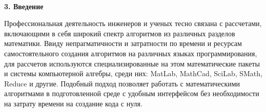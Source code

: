 \documentclass[russian,utf8,nocolumnxxxi,nocolumnxxxii]{eskdtext}
\begin{document}
\begin{figure}[H]
\begin{center}
\begin{minipage}[h]{0.75\linewidth}
  \\
\end{minipage}
\end{center}
\end{figure}
\newpage

{\bf3. Введение}

Профессиональная деятельность инженеров и ученых тесно связана с рассчетами, включающими в себя широкий спектр алгоритмов из различных разделов математики. Ввиду непрагматичности и затратности по времени и ресурсам самостоятельного создания алгоритмов на различных языках программирования, для рассчетов используются специализированные на этом математические пакеты и системы компьютерной алгебры, среди них: MatLab, MathCad, SciLab, SMath, Reduce и другие. Подобный подход позволяет работать с математическими алгоритмами в подготовленной среде с удобным интерфейсом без необходимости на затрату времени на создание кода с нуля. 
\end{document}
